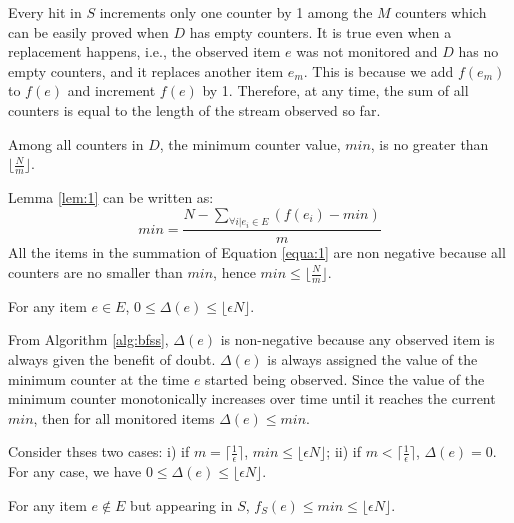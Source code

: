 \documentclass[conference]{IEEEtran}
\begin{document}
\begin{IEEEproof}
Every hit in $S$ increments only one counter by 1 among the $M$ counters which can be easily proved when $D$ has empty counters. It is true even when a replacement happens, i.e., the observed item $e$ was not monitored and $D$ has no empty counters, and it replaces another item $e_m$. This is because we add $f(e_m)$ to $f(e)$ and increment $f(e)$ by 1. Therefore, at any time, the sum of all counters is equal to the length of the stream observed so far.
\end{IEEEproof}


\begin{lemma} \label{lem:2}
Among all counters in $D$, the minimum counter value, $min$, is no greater than $\lfloor\frac{N}{m}\rfloor$.
\end{lemma}

\begin{IEEEproof}
Lemma \ref{lem:1} can be written as:
\begin{equation}\label{equa:1}
	min=\frac{N-\sum_{\forall i|e_i \in E}(f(e_i)-min)}{m}
\end{equation}
\indent All the items in the summation of Equation \ref{equa:1} are non negative because all counters are no smaller than $min$, hence $min\leq\lfloor \frac{N}{m}\rfloor$.
\end{IEEEproof}

\begin{lemma}\label{lem:3}
	For any item $e \in E$, $0 \leq \Delta(e) \leq \lfloor \epsilon N\rfloor$. 
\end{lemma}

\begin{IEEEproof}
From Algorithm \ref{alg:bfss}, $\Delta(e)$ is non-negative because any observed item is always given the benefit of doubt. $\Delta(e)$ is always assigned the value of the minimum counter at the time $e$ started being observed. Since the value of the minimum counter monotonically increases over time until it reaches the current $min$, then for all monitored items $\Delta(e) \leq min$.\par
Consider thses two cases: i) if $m=\lceil \frac{1}{\epsilon}\rceil$, $min\leq \lfloor \epsilon N\rfloor$; ii) if $m<\lceil \frac{1}{\epsilon}\rceil$, $\Delta(e)=0$. For any case, we have $0 \leq \Delta(e) \leq \lfloor \epsilon N\rfloor$.
\end{IEEEproof}

\begin{lemma}\label{lem:4}
	For any item $e\notin E$ but appearing in $S$, $f_S(e)\leq min\leq \lfloor \epsilon N\rfloor$.
\end{lemma}
\end{document}
